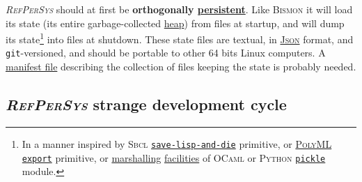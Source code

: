 \documentclass[11pt,a4paper,svgnames]{article}
\newcommand{\RefPerSys}{{\textit{\textsc{RefPerSys}}}}
\begin{document}
{\RefPerSys} should at first be \textbf{orthogonally
  \href{https://en.wikipedia.org/wiki/Persistence\_(computer\_science)}{persistent}}. Like
\textsc{Bismon} \cite{Starynkevitch:2019:bismon-draft} it will load
its state (its entire garbage-collected
\href{https://en.wikipedia.org/wiki/Memory\_management#HEAP}{heap})
from files at startup, and will dump its state\footnote{In a manner
inspired by \textsc{Sbcl}
\href{http://www.sbcl.org/manual/index.html\#Saving-a-Core-Image}{\texttt{save-lisp-and-die}}
primitive, or \href{https://www.polyml.org/}{\textsc{PolyML}}
\href{https://www.polyml.org/documentation/Reference/PolyMLStructure.html\#export}{\texttt{export}}
primitive, or
\href{https://en.wikipedia.org/wiki/Marshalling_(computer_science)}{marshalling}
\href{https://caml.inria.fr/pub/docs/manual-ocaml/libref/Marshal.html}{facilities} of \textsc{OCaml} or \textsc{Python}
\href{https://docs.python.org/3/library/pickle.html}{\texttt{pickle}}
module.} into files at shutdown. These state files are
textual, in \href{http://json.org/}{\textsc{Json}} format, and \texttt{git}-versioned, and should be portable to
other 64 bits Linux computers. A
\href{https://en.wikipedia.org/wiki/Manifest\_file}{manifest file}
describing the collection of files keeping the state is probably
needed.

\subsection{{\RefPerSys} strange development cycle}
\label{subsec:strange-devel}
\end{document}
